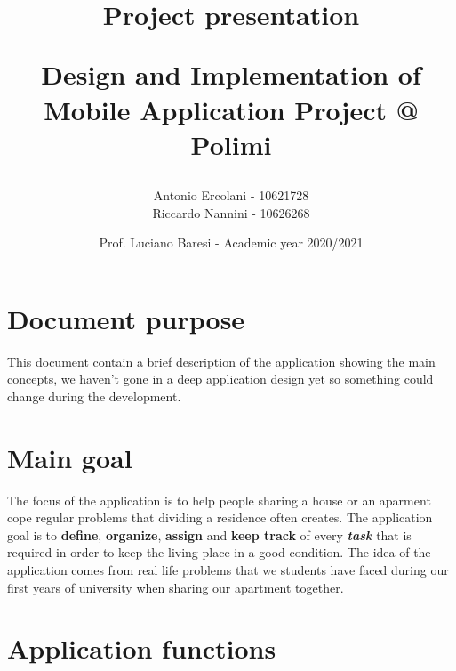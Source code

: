 \documentclass[]{article}
\title{ Project presentation \\
	\begin{large} 
		Design and Implementation of Mobile Application Project @ Polimi
	\end{large}}
\author{Antonio Ercolani - 10621728\\Riccardo Nannini - 10626268}
\date{Prof. Luciano Baresi - Academic year 2020/2021}
\begin{document}
	
	\maketitle
	
	\begin{paragraph}
		\newline
	\end{paragraph}
	
	\tableofcontents
	
	
	\section{Document purpose}
	This document contain a brief description of the application showing the main concepts, we haven't gone in a deep application design yet so something could change during the development.
	
	\section{Main goal}
	
	The focus of the application is to help people sharing a house or an aparment cope regular problems that dividing a residence often creates. \newline The application goal is to \textbf{define}, \textbf{organize}, \textbf{assign} and \textbf{keep track} of every \textit{\textbf{task}} that is required in order to keep the living place in a good condition. \newline The idea of the application comes from real life problems that we students have faced during our first years of university when sharing our apartment together.
	
	\section{Application functions}
	
\end{document}
